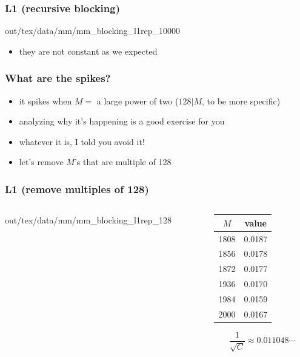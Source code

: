\documentclass[12pt,dvipdfmx]{beamer}
\begin{document}
\begin{frame}
\frametitle{L1 (recursive blocking)}
\begin{center}
\def\svgwidth{0.8\textwidth}  
out/tex/data/mm/mm\_blocking\_l1rep\_10000
\end{center}

\begin{itemize}
\item they are not constant as we expected
\end{itemize}
\end{frame}

\begin{frame}
\frametitle{What are the spikes?}
\begin{itemize}
\item it spikes when $M = $ a large power of two 
  ($128 | M$, to be more specific)
\item analyzing why it's happening is a good exercise for you
\item whatever it is, I told you avoid it!
\item let's remove $M$'s that are multiple of 128
\end{itemize}
\end{frame}

\begin{frame}
\frametitle{L1 (remove multiples of 128)}
\begin{columns}
  \begin{column}{0.7\textwidth}
\begin{center}
\def\svgwidth{0.8\textwidth}  
out/tex/data/mm/mm\_blocking\_l1rep\_128
\end{center}
  \end{column}
  \begin{column}{0.3\textwidth}
    \begin{tabular}{|c|c|}\hline
 $M$  & value  \\\hline
 1808 & 0.0187 \\
 1856 & 0.0178 \\
 1872 & 0.0177 \\
 1936 & 0.0170 \\
 1984 & 0.0159 \\
 2000 & 0.0167 \\\hline
    \end{tabular}
\[ \frac{1}{\sqrt{C}} \approx 0.011048\cdots \]
  \end{column}
\end{columns}
\end{frame}
\end{document}
